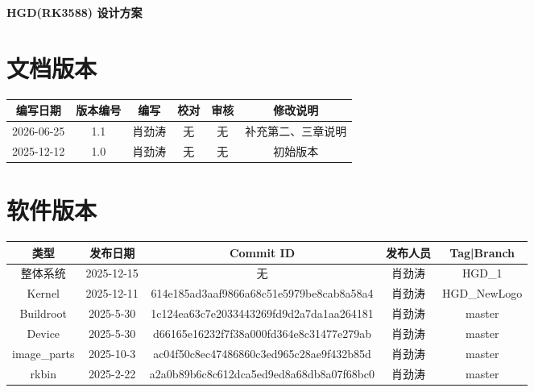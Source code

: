 \documentclass[UTF8]{ctexart}
\begin{document}

\pagestyle{empty}

\begin{center}
    \vspace*{2cm}
    {\Huge \textbf{HGD(RK3588) 设计方案}}
    \vspace{2cm}
\end{center}

\section*{文档版本}

\begin{center}
    \begin{tabular}{|*{6}{c|}} \hline
        编写日期 & 版本编号 & 编写 & 校对 & 审核 & 修改说明 \\ \hline
        2026-06-25 & 1.1 & 肖劲涛 & 无 & 无 & 补充第二、三章说明 \\ \hline
        2025-12-12 & 1.0 & 肖劲涛 & 无 & 无 & 初始版本 \\ \hline
    \end{tabular}
\end{center}

\vspace{1cm}

\section*{软件版本}

\begin{center}
    \begin{tabular}{|*{5}{c|}} \hline
        类型 & 发布日期 & Commit ID & 发布人员 & Tag|Branch \\ \hline
        整体系统 & 2025-12-15 & 无 & 肖劲涛 & HGD\_1  \\ \hline
        Kernel & 2025-12-11 & 614e185ad3aaf9866a68c51e5979be8cab8a58a4 & 肖劲涛  & HGD\_NewLogo \\ \hline
        Buildroot & 2025-5-30 & 1c124ea63c7e2033443269fd9d2a7da1aa264181 & 肖劲涛  & master \\ \hline
        Device & 2025-5-30 & d66165e16232f7f38a000fd364e8c31477e279ab & 肖劲涛 & master \\ \hline
        image\_parts & 2025-10-3 & ac04f50c8ec47486860c3ed965c28ae9f432b85d & 肖劲涛 & master \\ \hline
        rkbin & 2025-2-22 & a2a0b89b6c8c612dca5ed9ed8a68db8a07f68bc0 & 肖劲涛 & master \\ \hline
    \end{tabular}
\end{center}
\end{document}
